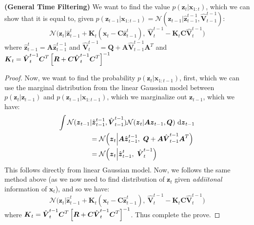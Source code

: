 \begin{proposition}{\textbf{(General Time Filtering)}}
    We want to find the value $p(\boldsymbol z_t | \boldsymbol x_{1:t})$, which we can show that it is equal to, given $p(\boldsymbol z_{t-1} | \boldsymbol x_{1:t-1}) = \mathcal{N}(\boldsymbol z_{t-1} | \hat{\boldsymbol z}_{t-1}^{t-1}, \hat{\boldsymbol V}^{t-1}_{t-1})$:
    \begin{equation*}
        \mathcal{N}\Big(\boldsymbol z_t \Big| \hat{\boldsymbol z}_{t-1}^{t} + \boldsymbol K_t(\boldsymbol x_t - \boldsymbol C \hat{\boldsymbol z}_{t-1}^{t}),  \ \hat{\boldsymbol V}^{t-1}_{t} - \boldsymbol K_t\boldsymbol C\hat{\boldsymbol V}^{t-1}_{t} \Big)
    \end{equation*}
    where $\hat{\boldsymbol z}_{t-1}^{t} =  \boldsymbol A\hat{\boldsymbol z}_{t-1}^{t-1}$ and $\hat{\boldsymbol V}^{t-1}_{t} = \boldsymbol Q + \boldsymbol A \hat{\boldsymbol V}^{t-1}_{t-1}\boldsymbol A^T$ and $\boldsymbol K_t = \hat{\boldsymbol V}^{t-1}_{t}\boldsymbol C^T\left[ \boldsymbol R + \boldsymbol C\hat{\boldsymbol V}^{t-1}_{t}\boldsymbol C^T \right]^{-1}$
\end{proposition}
\begin{proof}
    Now, we want to find the probability $p(\boldsymbol z_t | \boldsymbol x_{1:t-1})$, first, which we can use the marginal distribution from the linear Gaussian model between $p(\boldsymbol z_t | \boldsymbol z_{t-1})$ and $p(\boldsymbol z_{t-1} | \boldsymbol x_{1:t-1})$, which we marginalize out $\boldsymbol z_{t-1}$, which we have:
    \begin{equation*}
    \begin{aligned} 
        \int \mathcal{N}(\boldsymbol z_{t-1} &| \hat{\boldsymbol z}_{t-1}^{t-1}, \hat{\boldsymbol V}^{t-1}_{t-1})\mathcal{N}(\boldsymbol z_t | \boldsymbol A\boldsymbol z_{t-1}, \boldsymbol Q)\ \mathrm{d} \boldsymbol z_{t-1} \\
        &= \mathcal{N}\Big(\boldsymbol z_t \Big| \boldsymbol A\hat{\boldsymbol z}_{t-1}^{t-1}, \ \boldsymbol Q + \boldsymbol A \hat{\boldsymbol V}^{t-1}_{t-1}\boldsymbol A^T \Big) \\
        &= \mathcal{N}\Big(\boldsymbol z_t \Big| \hat{\boldsymbol z}_{t-1}^{t}, \ \hat{\boldsymbol V}^{t-1}_{t}\Big)
    \end{aligned}
    \end{equation*}
    This follows directly from linear Gaussian model. Now, we follows the same method above (as we now need to find distribution of $\boldsymbol z_t$ given \emph{addiitonal} information of $\boldsymbol x_t$), and so we have:
    \begin{equation*}
        \mathcal{N}\Big(\boldsymbol z_t \Big| \hat{\boldsymbol z}_{t-1}^{t} + \boldsymbol K_t(\boldsymbol x_t - \boldsymbol C \hat{\boldsymbol z}_{t-1}^{t}),  \ \hat{\boldsymbol V}^{t-1}_{t} - \boldsymbol K_t\boldsymbol C\hat{\boldsymbol V}^{t-1}_{t} \Big)
    \end{equation*}
    where $\boldsymbol K_t = \hat{\boldsymbol V}^{t-1}_{t}\boldsymbol C^T\left[ \boldsymbol R + \boldsymbol C\hat{\boldsymbol V}^{t-1}_{t}\boldsymbol C^T \right]^{-1}$. Thus complete the prove.
\end{proof}

